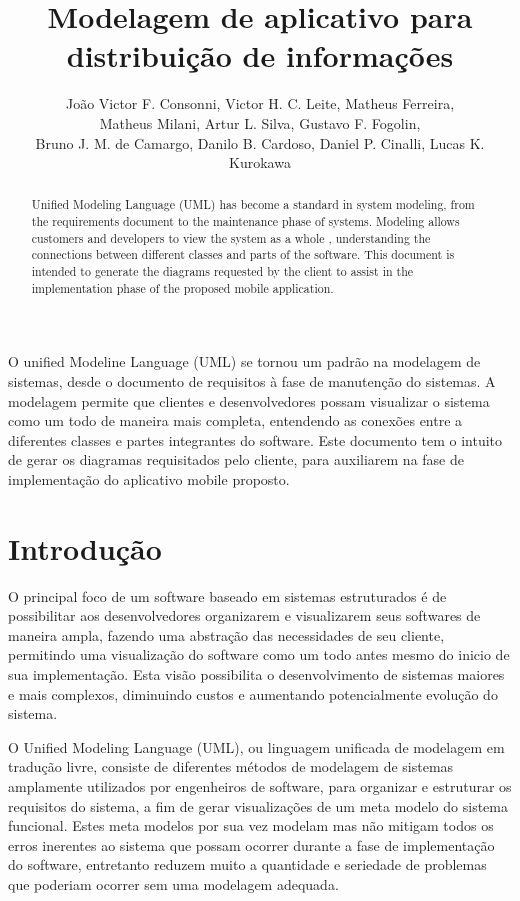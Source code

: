 \documentclass[12pt]{article}
\title{Modelagem de aplicativo para distribuição de informações}
\author{João Victor F. Consonni\inst{1}, Victor H. C. Leite\inst{1}, Matheus Ferreira\inst{1}, \\Matheus Milani\inst{1}, Artur L. Silva\inst{1}, Gustavo F. Fogolin\inst{1}, \\Bruno J. M. de Camargo\inst{1}, Danilo B. Cardoso\inst{1}, Daniel P. Cinalli\inst{1}, Lucas K. Kurokawa\inst{1}}
\begin{document}
 

\maketitle

\begin{abstract} 
  Unified Modeling Language (UML) has become a standard in system modeling, from the requirements document to the maintenance phase of systems. Modeling allows customers and developers to view the system as a whole , understanding the connections between different classes and parts of the software. This document is intended to generate the diagrams requested by the client to assist in the implementation phase of the proposed mobile application.
\end{abstract}

\begin{resumo} 
   O unified Modeline Language (UML) se tornou um padrão na modelagem de sistemas, desde o documento de requisitos à fase de manutenção do sistemas. A modelagem permite que clientes e desenvolvedores possam visualizar o sistema como um todo de maneira mais completa, entendendo as conexões entre a  diferentes classes e partes integrantes do software. Este documento tem o intuito de gerar os diagramas requisitados pelo cliente, para auxiliarem na fase de implementação do aplicativo mobile proposto.
\end{resumo}

\newpage

\tableofcontents   

\newpage

\section{Introdução}
O principal foco de um software baseado em sistemas estruturados é de possibilitar aos desenvolvedores organizarem e visualizarem seus softwares de maneira ampla, fazendo uma abstração das necessidades de seu cliente, permitindo uma visualização do software como um todo antes mesmo do inicio de sua implementação. Esta visão possibilita o desenvolvimento de sistemas maiores e mais complexos, diminuindo custos e aumentando potencialmente evolução do sistema.\cite{chaudron2012effective}

O Unified Modeling Language (UML), ou linguagem unificada de modelagem em tradução livre, consiste de diferentes métodos de modelagem de sistemas amplamente utilizados por engenheiros de software, para organizar e estruturar os requisitos do sistema, a fim de gerar visualizações de um meta modelo do sistema funcional. Estes meta modelos por sua vez modelam mas  não mitigam todos os erros inerentes ao sistema que possam ocorrer durante a fase de implementação do software, entretanto reduzem muito a quantidade e seriedade de problemas que poderiam ocorrer sem uma modelagem adequada.\cite{Medvidovic:2002:MSA:504087.504088}
\end{document}
